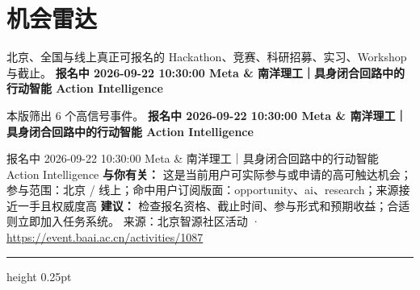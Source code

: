 \documentclass[10.5pt]{ctexart}
\begin{document}
\section*{机会雷达}
{\color{ormuted} 北京、全国与线上真正可报名的 Hackathon、竞赛、科研招募、实习、Workshop 与截止。}
\vspace{2mm}
{\LARGE\bfseries 报名中 2026-09-22 10:30:00 Meta \& 南洋理工｜具身闭合回路中的行动智能 Action Intelligence}\par
\vspace{1mm}
{\color{ormuted} 本版筛出 6 个高信号事件。}
\vspace{3mm}
{\Large\bfseries 报名中 2026-09-22 10:30:00 Meta \& 南洋理工｜具身闭合回路中的行动智能 Action Intelligence}\par
报名中 2026-09-22 10:30:00 Meta \& 南洋理工｜具身闭合回路中的行动智能 Action Intelligence
\textbf{与你有关：} 这是当前用户可实际参与或申请的高可触达机会；参与范围：北京 / 线上；命中用户订阅版面：opportunity、ai、research；来源接近一手且权威度高
\textbf{建议：} 检查报名资格、截止时间、参与形式和预期收益；合适则立即加入任务系统。
{\footnotesize\color{ormuted} 来源：北京智源社区活动 · \url{https://event.baai.ac.cn/activities/1087}}
\vspace{4mm}
\hrule height 0.25pt
\vspace{3mm}
\end{document}
